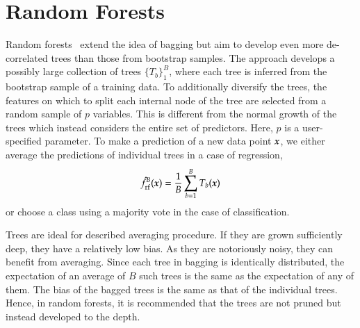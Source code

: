 \begin{refsection}
\begin{example}
\end{example}

\section{Random Forests}

Random forests~\cite{Brieman2001} extend the idea of bagging but aim to develop even more de-correlated trees than those from bootstrap samples. The approach develops a possibly large collection of trees $\{T_b\}_1^B$, where each tree is inferred from the bootstrap sample of a training data. To additionally diversify the trees, the features on which to split each internal node of the tree are selected from a random sample of $p$ variables. This is different from the normal growth of the trees which instead considers the entire set of predictors. Here, $p$ is a user-specified parameter. To make a prediction of a new data point $\boldsymbol{x}$, we either average the predictions of individual trees in a case of regression,
$$ \hat{f}_{\rm rf}^B(\boldsymbol{x})={1\over B}\sum_{b=1}^B T_b({\boldsymbol{x}}) $$
or choose a class using a majority vote in the case of classification.

Trees are ideal for described averaging procedure. If they are grown sufficiently deep, they have a relatively low bias. As they are notoriously noisy, they can benefit from averaging. Since each tree in bagging is identically distributed, the expectation of an average of $B$ such trees is the same as the expectation of any of them. The bias of the bagged trees is the same as that of the individual trees. Hence, in random forests, it is recommended that the trees are not pruned but instead developed to the depth. 


\end{refsection}
